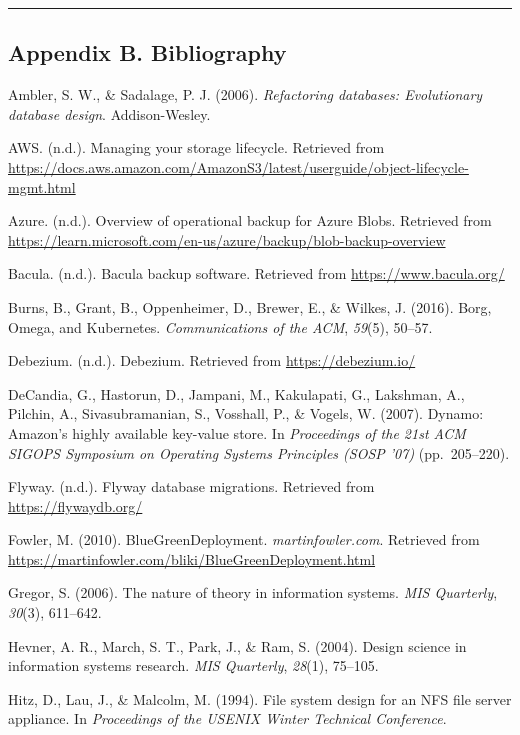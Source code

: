 \documentclass[
]{article}
\begin{document}
\begin{center}\rule{0.5\linewidth}{0.5pt}\end{center}

\subsection{Appendix B. Bibliography}\label{appendix-b.-bibliography}

Ambler, S. W., \& Sadalage, P. J. (2006). \emph{Refactoring databases:
Evolutionary database design}. Addison-Wesley.

AWS. (n.d.). Managing your storage lifecycle. Retrieved from
\url{https://docs.aws.amazon.com/AmazonS3/latest/userguide/object-lifecycle-mgmt.html}

Azure. (n.d.). Overview of operational backup for Azure Blobs. Retrieved
from
\url{https://learn.microsoft.com/en-us/azure/backup/blob-backup-overview}

Bacula. (n.d.). Bacula backup software. Retrieved from
\url{https://www.bacula.org/}

Burns, B., Grant, B., Oppenheimer, D., Brewer, E., \& Wilkes, J. (2016).
Borg, Omega, and Kubernetes. \emph{Communications of the ACM},
\emph{59}(5), 50--57.

Debezium. (n.d.). Debezium. Retrieved from \url{https://debezium.io/}

DeCandia, G., Hastorun, D., Jampani, M., Kakulapati, G., Lakshman, A.,
Pilchin, A., Sivasubramanian, S., Vosshall, P., \& Vogels, W. (2007).
Dynamo: Amazon's highly available key-value store. In \emph{Proceedings
of the 21st ACM SIGOPS Symposium on Operating Systems Principles (SOSP
'07)} (pp.~205--220).

Flyway. (n.d.). Flyway database migrations. Retrieved from
\url{https://flywaydb.org/}

Fowler, M. (2010). BlueGreenDeployment. \emph{martinfowler.com}.
Retrieved from
\url{https://martinfowler.com/bliki/BlueGreenDeployment.html}

Gregor, S. (2006). The nature of theory in information systems.
\emph{MIS Quarterly}, \emph{30}(3), 611--642.

Hevner, A. R., March, S. T., Park, J., \& Ram, S. (2004). Design science
in information systems research. \emph{MIS Quarterly}, \emph{28}(1),
75--105.

Hitz, D., Lau, J., \& Malcolm, M. (1994). File system design for an NFS
file server appliance. In \emph{Proceedings of the USENIX Winter
Technical Conference}.
\end{document}
